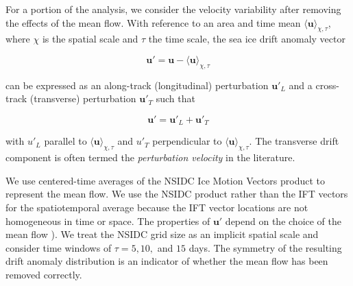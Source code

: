 \documentclass[review, jog]{igs}
\begin{document}
For a portion of the analysis, we consider the velocity variability after removing the effects of the mean flow. With reference to an area and time mean $\langle \mathbf{u} \rangle_{\chi, \tau}$, where $\chi$ is the spatial scale and $\tau$ the time scale, 
the sea ice drift anomaly vector
\begin{linenomath*}
\begin{equation}
\mathbf{u'} = \mathbf{u} - \langle \mathbf{u} \rangle_{\chi, \tau} \label{eqn:drift_anom}
\end{equation}
\end{linenomath*}
\noindent
can be expressed as an along-track (longitudinal) perturbation $\mathbf{u'}_L$ and a cross-track (transverse) perturbation $\mathbf{u'}_T$ such that
\begin{linenomath*}
\begin{equation}
\mathbf{u'} = \mathbf{u'}_L + \mathbf{u'}_T \label{eqn:drift_comp}
\end{equation}
\end{linenomath*}
with $u'_L$ parallel to $\langle \mathbf{u} \rangle_{\chi, \tau}$ and $u'_T$ perpendicular to $\langle \mathbf{u} \rangle_{\chi, \tau} $\citep{lacasce2008_LagrangianStatistics, gabrielski2015_AnomalousDispersion}.
The transverse drift component is often termed the \emph{perturbation velocity} in the literature. 

We use centered-time averages of the NSIDC Ice Motion Vectors product to represent the mean flow.
We use the NSIDC product rather than the IFT vectors for the spatiotemporal average because the IFT vector locations are not homogeneous in time or space.
The properties of $\mathbf{u}'$ depend on the choice of the mean flow 
\citep{rampal2009_turbulentFluctuations}).
We treat the NSIDC grid size as an implicit spatial scale and consider time windows of $\tau=5, 10, $ and $15$ days. 
The symmetry of the resulting drift anomaly distribution is an indicator of whether the mean flow has been removed correctly.
\end{document}
